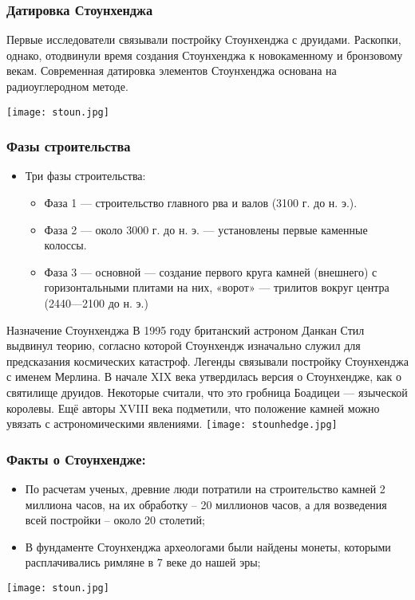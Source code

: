\documentclass{beamer}
\begin{document}
\begin{frame}
\frametitle{Датировка Стоунхенджа}
Первые исследователи связывали постройку Стоунхенджа с друидами. Раскопки, однако, отодвинули время создания Стоунхенджа к новокаменному и бронзовому векам.
Современная датировка элементов Стоунхенджа основана на радиоуглеродном методе.\par

\centering\texttt{[image: stoun.jpg]}\par

\end{frame}
\begin{frame}
\frametitle{Фазы строительства}
\begin{itemize}
\item{Три фазы строительства:}
\begin{itemize}
 \item Фаза 1 — строительство главного рва и валов (3100 г. до н. э.).
 \item Фаза 2 — около 3000 г. до н. э. — установлены первые каменные колоссы.
 \item Фаза 3 — основной — создание первого круга камней (внешнего) с горизонтальными плитами на них, «ворот» — трилитов вокруг центра (2440—2100 до н. э.)
\end{itemize}
\end{itemize}
\end{frame}
\begin{frame}{Назначение Стоунхенджа}
В 1995 году британский астроном Данкан Стил выдвинул теорию, согласно которой Стоунхендж изначально служил для предсказания космических катастроф.
Легенды связывали постройку Стоунхенджа с именем Мерлина.
В начале XIX века утвердилась версия о Стоунхендже, как о святилище друидов. Некоторые считали, что это гробница Боадицеи — языческой королевы.
Ещё авторы XVIII века подметили, что положение камней можно увязать с астрономическими явлениями.
\centering\texttt{[image: stounhedge.jpg]}\par
\end{frame}
\begin{frame}
\frametitle{Факты о Стоунхендже:}
\begin{itemize}
	\item По расчетам ученых, древние люди потратили на строительство камней 2 миллиона часов, 
	на их обработку – 20 миллионов часов, а для возведения всей постройки – около 20 столетий;
	\item В фундаменте Стоунхенджа археологами были найдены монеты, которыми расплачивались римляне в 7 веке до нашей эры;
\end{itemize}
\centering\texttt{[image: stoun.jpg]}\par
\end{frame}
\end{document}
